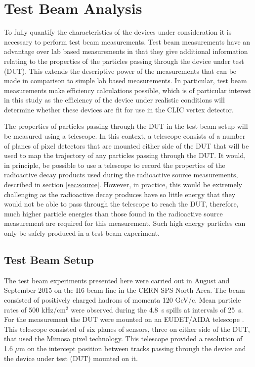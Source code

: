 
\section{Test Beam Analysis}
\label{sec:testbeam}
To fully quantify the characteristics of the devices under consideration it is necessary to perform test beam measurements.  Test beam measurements have an advantage over lab based measurements in that they give additional information relating to the properties of the particles passing through the device under test (DUT).  This extends the descriptive power of the measurements that can be made in comparison to simple lab based measurements.  In particular, test beam measurements make efficiency calculations possible, which is of particular interest in this study as the efficiency of the device under realistic conditions will determine whether these devices are fit for use in the CLIC vertex detector.  

The properties of particles passing through the DUT in the test beam setup will be measured using a telescope.  In this context, a telescope consists of a number of planes of pixel detectors that are mounted either side of the DUT that will be used to map the trajectory of any particles passing through the DUT.  It would, in principle, be possible to use a telescope to record the properties of the radioactive decay products used during the radioactive source measurements, described in section \ref{sec:source}.  However, in practice, this would be extremely challenging as the radioactive decay produces have so little energy that they would not be able to pass through the telescope to reach the DUT, therefore, much higher particle energies than those found in the radioactive source measurement are required for this measurement.  Such high energy particles can only be safely produced in a test beam experiment. 


\subsection{Test Beam Setup}
The test beam experiments presented here were carried out in August and September 2015 on the H6 beam line in the CERN SPS North Area.  The beam consisted of positively charged hadrons of momenta 120 GeV/c.  Mean particle rates of 500 kHz/cm$^{2}$ were observed during the 4.8~s spills at intervals of 25~s.  For the measurement the DUT were mounted on an EUDET/AIDA telescope \cite{Rubinskiy:2000287}.  This telescope consisted of six planes of sensors, three on either side of the DUT, that used the Mimosa pixel technology.  This telescope provided a resolution of 1.6 $\mu$m on the intercept position between tracks passing through the device and the device under test (DUT) mounted on it.  

